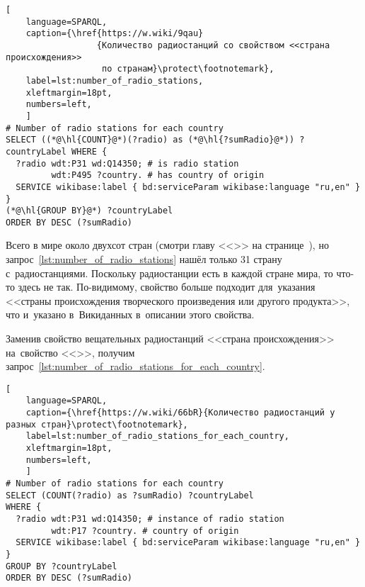 \begin{lstlisting}[ 
    language=SPARQL,
    caption={\href{https://w.wiki/9qau}
                  {Количество радиостанций со свойством <<страна происхождения>>
                   по странам}\protect\footnotemark},
    label=lst:number_of_radio_stations,
    xleftmargin=18pt,
    numbers=left,
    ]
# Number of radio stations for each country 
SELECT ((*@\hl{COUNT}@*)(?radio) as (*@\hl{?sumRadio}@*)) ?countryLabel WHERE {
  ?radio wdt:P31 wd:Q14350; # is radio station
         wdt:P495 ?country. # has country of origin
  SERVICE wikibase:label { bd:serviceParam wikibase:language "ru,en" }
}
(*@\hl{GROUP BY}@*) ?countryLabel
ORDER BY DESC (?sumRadio)
\end{lstlisting}%

Всего в мире около двухсот стран (смотри главу <<>> 
на странице~\pageref{ch:RussiaNotCountryPPS}), 
но запрос~\ref{lst:number_of_radio_stations} нашёл только 31 страну с~радиостанциями. 
Поскольку радиостанции есть в каждой стране мира, то что-то здесь не так. 
По-видимому, свойство  больше подходит для~указания 
<<страны происхождения творческого произведения или другого продукта>>, 
что и~указано в~Викиданных в~описании этого свойства. 

Заменив свойство вещательных радиостанций <<страна происхождения>> 
на~свойство <<>>, 
получим запрос~\ref{lst:number_of_radio_stations_for_each_country}. 

\begin{lstlisting}[ 
    language=SPARQL,
    caption={\href{https://w.wiki/66bR}{Количество радиостанций у разных стран}\protect\footnotemark},
    label=lst:number_of_radio_stations_for_each_country,
    xleftmargin=18pt,
    numbers=left,
    ]
# Number of radio stations for each country 
SELECT (COUNT(?radio) as ?sumRadio) ?countryLabel
WHERE {
  ?radio wdt:P31 wd:Q14350; # instance of radio station
         wdt:P17 ?country. # country of origin
  SERVICE wikibase:label { bd:serviceParam wikibase:language "ru,en" }
}
GROUP BY ?countryLabel
ORDER BY DESC (?sumRadio)
\end{lstlisting}%


